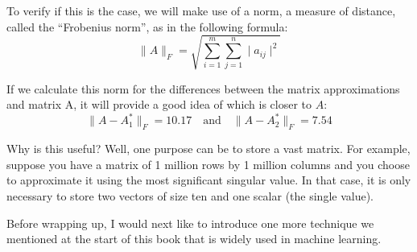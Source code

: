 \documentclass[a4,12pt,twosided,openany]{memoir}
\begin{document}
\par 
\indent
To verify if this is the case, we will make use of a norm, a measure of distance, called the “Frobenius norm”, as in the following formula:
\[
\lVert A \rVert_F = \sqrt{\sum_{i=1}^m \sum_{j=1}^n \mid a_{ij} \mid^2}
\]
\par 
\indent
If we calculate this norm for the differences between the matrix approximations and matrix A, it will provide a good idea of which is closer to $A$:
\[\lVert A - A_1^* \rVert_F = 10.17 \quad \textrm{and} \quad  \lVert A - A_2^* \rVert_F = 7.54\]
\par 
\indent
Why is this useful? Well, one purpose can be to store a vast matrix. For example, suppose you have a matrix of 1 million rows by 1 million columns and you choose to approximate it using the most significant singular value. In that case, it is only necessary to store two vectors of size ten and one scalar (the single value). 
\par 
\indent
Before wrapping up, I would next like to introduce one more technique we mentioned at the start of this book that is widely used in machine learning.
\end{document}
